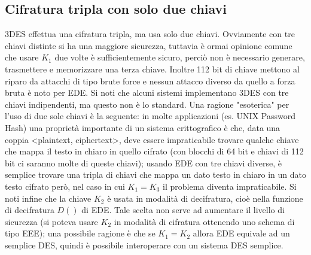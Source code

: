 \subsection{Cifratura tripla con solo due chiavi}
3DES effettua una cifratura tripla, ma usa solo due chiavi. Ovviamente con tre chiavi distinte si ha una maggiore sicurezza, tuttavia è ormai opinione comune che usare $K_{1}$ due volte è sufficientemente sicuro, perciò non è necessario generare, trasmettere e memorizzare una terza chiave. Inoltre 112 bit di chiave mettono al riparo da attacchi di tipo brute force e nessun attacco diverso da quello a forza bruta è noto per EDE. Si noti che alcuni sistemi implementano 3DES con tre chiavi indipendenti, ma questo non è lo standard.
\newline \newline
Una ragione "esoterica" per l'uso di due sole chiavi è la seguente: in molte applicazioni (es. UNIX Password Hash) una proprietà importante di un sistema crittografico è che, data una coppia <plaintext, ciphertext>, deve essere impraticabile trovare qualche chiave che mappa il testo in chiaro in quello cifrato (con blocchi di 64 bit e chiavi di 112 bit ci saranno molte di queste chiavi); usando EDE con tre chiavi diverse, è semplice trovare una tripla di chiavi che mappa un dato testo in chiaro in un dato testo cifrato però, nel caso in cui $K_{1} = K_{3}$ il problema diventa impraticabile.
\newline \newline
Si noti infine che la chiave $K_{2}$ è usata in modalità di decifratura, cioè nella funzione di decifratura
$D()$ di EDE. Tale scelta non serve ad aumentare il livello di sicurezza (si poteva usare $K_{2}$ in modalità di
cifratura ottenendo uno schema di tipo EEE); una possibile ragione è che se $K_{1} = K_{2}$ allora EDE
equivale ad un semplice DES, quindi è possibile interoperare con un sistema DES semplice.
